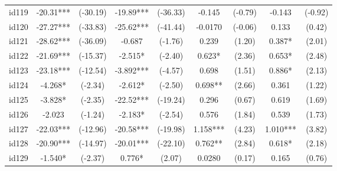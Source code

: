 \documentclass[entropy,article,submit,moreauthors,LaTeX and dvi2pdf]{Definitions/mdpi}
\begin{document}
\begin{center}
\begin{longtable}{ccccccccc}
id119                                         & -20.31***     & (-30.19)      & -19.89***       & (-36.33)         & -0.145            & (-0.79)           & -0.143            & (-0.92)           \\
id120                                         & -27.27***     & (-33.83)      & -25.62***       & (-41.44)         & -0.0170           & (-0.06)           & 0.133             & (0.42)            \\
id121                                         & -28.62***     & (-36.09)      & -0.687          & (-1.76)          & 0.239             & (1.20)            & 0.387*            & (2.01)            \\
id122                                         & -21.69***     & (-15.37)      & -2.515*         & (-2.40)          & 0.623*            & (2.36)            & 0.653*            & (2.48)            \\
id123                                         & -23.18***     & (-12.54)      & -3.892***       & (-4.57)          & 0.698             & (1.51)            & 0.886*            & (2.13)            \\
id124                                         & -4.268*       & (-2.34)       & -2.612*         & (-2.50)          & 0.698**           & (2.66)            & 0.361             & (1.22)            \\
id125                                         & -3.828*       & (-2.35)       & -22.52***       & (-19.24)         & 0.296             & (0.67)            & 0.619             & (1.69)            \\
id126                                         & -2.023        & (-1.24)       & -2.183*         & (-2.54)          & 0.576             & (1.84)            & 0.539             & (1.73)            \\
id127                                         & -22.03***     & (-12.96)      & -20.58***       & (-19.98)         & 1.158***          & (4.23)            & 1.010***          & (3.82)            \\
id128                                         & -20.90***     & (-14.97)      & -20.01***       & (-22.10)         & 0.762**           & (2.84)            & 0.618*            & (2.18)            \\
id129                                         & -1.540*       & (-2.37)       & 0.776*          & (2.07)           & 0.0280            & (0.17)            & 0.165             & (0.76)            \\

\end{longtable}
\end{center}
\end{document}
